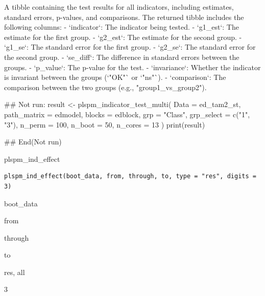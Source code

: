 \documentclass[a4paper]{book}
\begin{document}
%
\begin{Value}
A tibble containing the test results for all indicators, including estimates, standard errors, p-values, and comparisons.
The returned tibble includes the following columns:
- `indicator`: The indicator being tested.
- `g1\_est`: The estimate for the first group.
- `g2\_est`: The estimate for the second group.
- `g1\_se`: The standard error for the first group.
- `g2\_se`: The standard error for the second group.
- `se\_diff`: The difference in standard errors between the groups.
- `p\_value`: The p-value for the test.
- `invariance`: Whether the indicator is invariant between the groups (`"OK"` or `"ns"`).
- `comparison`: The comparison between the two groups (e.g., "group1\_vs\_group2").
\end{Value}
%
\begin{Examples}
\begin{ExampleCode}
\#\# Not run: 
result <- plspm_indicator_test_multi(
  Data = ed_tam2_st,
  path_matrix = edmodel,
  blocks = edblock,
  grp = "Class",
  grp_select = c("1", "3"),
  n_perm = 100,
  n_boot = 50,
  n_cores = 13
)
print(result)

## End(Not run)
\end{ExampleCode}
\end{Examples}
%
\begin{Description}
plspm\_ind\_effect
\end{Description}
%
\begin{Usage}
\begin{verbatim}
plspm_ind_effect(boot_data, from, through, to, type = "res", digits = 3)
\end{verbatim}
\end{Usage}
%
\begin{Arguments}
\begin{ldescription}
\item[\code{boot\_data}] boot\_data

\item[\code{from}] from

\item[\code{through}] through

\item[\code{to}] to

\item[\code{type}] res, all

\item[\code{digits}] 3
\end{ldescription}
\end{Arguments}
\end{document}
